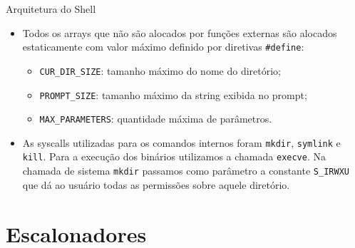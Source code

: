 \documentclass[10pt]{beamer}
\begin{document}
    \begin{frame}{Arquitetura do Shell}
      \begin{itemize}
        \justifying
        \item Todos os arrays que não são alocados por funções externas são alocados estaticamente com valor máximo definido por diretivas \texttt{\#define}:
        \begin{itemize}
          \vspace{-0.25in}
          \item \texttt{CUR\_DIR\_SIZE}: tamanho máximo do nome do diretório;
          \item \texttt{PROMPT\_SIZE}: tamanho máximo da string exibida no prompt;
          \item \texttt{MAX\_PARAMETERS}: quantidade máxima de parâmetros.
        \end{itemize}
        \item As syscalls utilizadas para os comandos internos foram \texttt{mkdir}, \texttt{symlink} e \texttt{kill}. Para a execução dos binários utilizamos a chamada \texttt{execve}. 
        Na chamada de sistema \texttt{mkdir} passamos como parâmetro a 
        constante \texttt{S\_IRWXU} que dá ao usuário todas as permissões 
        sobre aquele diretório.
      \end{itemize}
    \end{frame}
    \section{Escalonadores}
\end{document}
